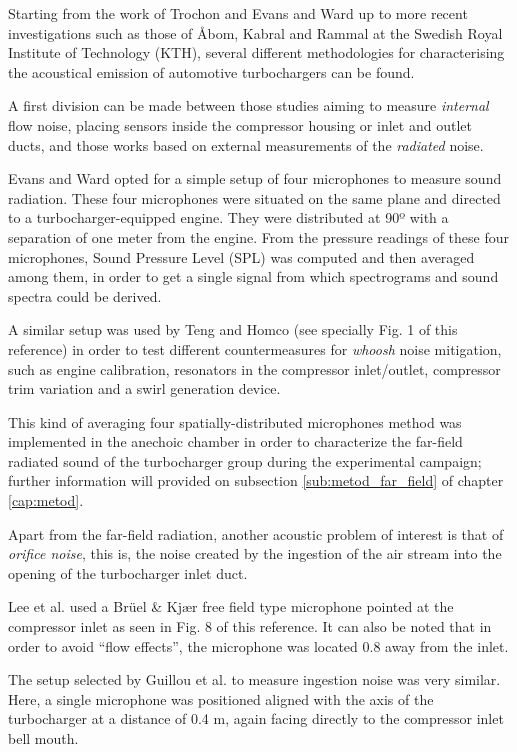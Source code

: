 Starting from the work of Trochon \cite{trochon2001new} and Evans and Ward \cite{evans2005minimizing,evans2006reduction} up to more recent investigations such as those of Åbom, Kabral and Rammal \cite{kabral2013ac,kabral2014inves} at the Swedish Royal Institute of Technology (KTH), several different methodologies for characterising the acoustical emission of automotive turbochargers can be found.

A first division can be made between those studies aiming to measure \emph{internal} flow noise, placing sensors inside the compressor housing or inlet and outlet ducts, and those works based on external measurements of the \emph{radiated} noise.

Evans and Ward \cite{evans2005minimizing,evans2006reduction} opted for a simple setup of four microphones to measure sound radiation. These four microphones were situated on the same plane and directed to a turbocharger-equipped engine. They were distributed at 90º with a separation of one meter from the engine. From the pressure readings of these four microphones, Sound Pressure Level (SPL) was computed and then averaged among them, in order to get a single signal from which spectrograms and sound spectra could be derived.

A similar setup was used by Teng and Homco \cite{teng2009investigation} (see specially Fig. 1 of this reference) in order to test different countermeasures for \emph{whoosh} noise mitigation, such as engine calibration, resonators in the compressor inlet/outlet, compressor trim variation and a swirl generation device. 

This kind of averaging four spatially-distributed microphones method was implemented in the anechoic chamber in order to characterize the far-field radiated sound of the turbocharger group during the experimental campaign; further information will provided on subsection \ref{sub:metod_far_field} of chapter \ref{cap:metod}.

Apart from the far-field radiation, another acoustic problem of interest is that of \emph{orifice noise}, this is, the noise created by the ingestion of the air stream into the opening of the turbocharger inlet duct. 

Lee et al. \cite{lee2011control} used a Brüel \& Kj\ae r free field type microphone pointed at the compressor inlet as seen in Fig. 8 of this reference. It can also be noted that in order to avoid ``flow effects'', the microphone was located 0.8 away from the inlet.

The setup selected by Guillou et al. \cite{guillou2010characterization} to measure ingestion noise was very similar. Here, a single microphone was positioned aligned with the axis of the turbocharger at a distance of 0.4 m, again facing directly to the compressor inlet bell mouth.

